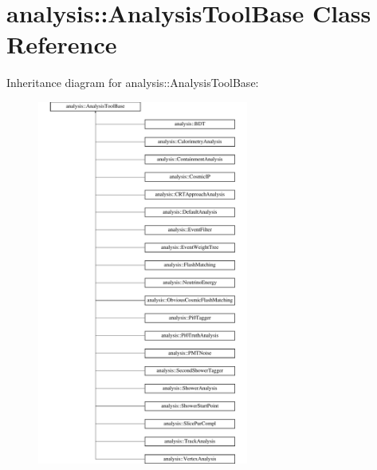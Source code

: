 \hypertarget{classanalysis_1_1AnalysisToolBase}{}\section{analysis\+:\+:Analysis\+Tool\+Base Class Reference}
\label{classanalysis_1_1AnalysisToolBase}
Inheritance diagram for analysis\+:\+:Analysis\+Tool\+Base\+:\begin{figure}[H]
\begin{center}
\leavevmode
\includegraphics[height=12.000000cm]{classanalysis_1_1AnalysisToolBase}
\end{center}
\end{figure}
